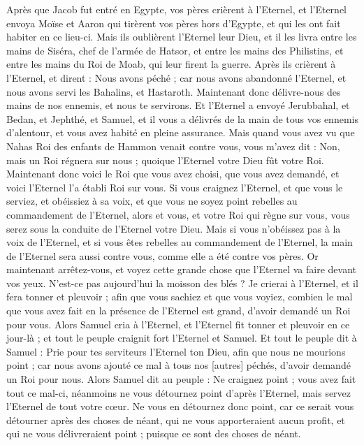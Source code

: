 \begin{multicols}{2}
Après que Jacob fut entré en Egypte, vos pères crièrent à l'Eternel, et l'Eternel envoya Moïse et Aaron qui tirèrent vos pères hors d'Egypte, et qui les ont fait habiter en ce lieu-ci.
Mais ils oublièrent l'Eternel leur Dieu, et il les livra entre les mains de Siséra, chef de l'armée de Hatsor, et entre les mains des Philistins, et entre les mains du Roi de Moab, qui leur firent la guerre.
Après ils crièrent à l'Eternel, et dirent : Nous avons péché ; car nous avons abandonné l'Eternel, et nous avons servi les Bahalins, et Hastaroth. Maintenant donc délivre-nous des mains de nos ennemis, et nous te servirons.
Et l'Eternel a envoyé Jerubbahal, et Bedan, et Jephthé, et Samuel, et il vous a délivrés de la main de tous vos ennemis d'alentour, et vous avez habité en pleine assurance.
Mais quand vous avez vu que Nahas Roi des enfants de Hammon venait contre vous, vous m'avez dit : Non, mais un Roi régnera sur nous ; quoique l'Eternel votre Dieu fût votre Roi.
Maintenant donc voici le Roi que vous avez choisi, que vous avez demandé, et voici l'Eternel l'a établi Roi sur vous.
Si vous craignez l'Eternel, et que vous le serviez, et obéissiez à sa voix, et que vous ne soyez point rebelles au commandement de l'Eternel, alors et vous, et votre Roi qui règne sur vous, vous serez sous la conduite de l'Eternel votre Dieu.
Mais si vous n'obéissez pas à la voix de l'Eternel, et si vous êtes rebelles au commandement de l'Eternel, la main de l'Eternel sera aussi contre vous, comme elle a été contre vos pères.
Or maintenant arrêtez-vous, et voyez cette grande chose que l'Eternel va faire devant vos yeux.
N'est-ce pas aujourd'hui la moisson des blés ? Je crierai à l'Eternel, et il fera tonner et pleuvoir ; afin que vous sachiez et que vous voyiez, combien le mal que vous avez fait en la présence de l'Eternel est grand, d'avoir demandé un Roi pour vous.
Alors Samuel cria à l'Eternel, et l'Eternel fit tonner et pleuvoir en ce jour-là ; et tout le peuple craignit fort l'Eternel et Samuel.
Et tout le peuple dit à Samuel : Prie pour tes serviteurs l'Eternel ton Dieu, afin que nous ne mourions point ; car nous avons ajouté ce mal à tous nos [autres] péchés, d'avoir demandé un Roi pour nous.
Alors Samuel dit au peuple : Ne craignez point ; vous avez fait tout ce mal-ci, néanmoins ne vous détournez point d'après l'Eternel, mais servez l'Eternel de tout votre cœur.
Ne vous en détournez donc point, car ce serait vous détourner après des choses de néant, qui ne vous apporteraient aucun profit, et qui ne vous délivreraient point ; puisque ce sont des choses de néant.

\end{multicols}
